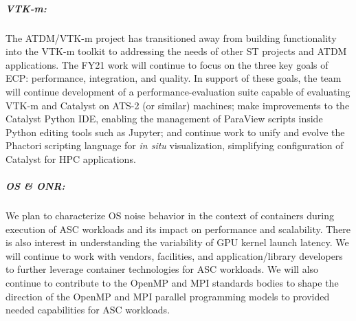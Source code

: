 \subparagraph{VTK-m:} The ATDM/VTK-m project has transitioned away from building functionality into the VTK-m toolkit to addressing the needs of other ST projects and ATDM applications. The FY21 work will continue to focus on the three key goals of ECP: performance, integration, and quality.  In support of these goals, the team will continue development of a performance-evaluation suite capable of evaluating VTK-m and Catalyst on ATS-2 (or similar) machines; make improvements to the Catalyst Python IDE, enabling the management of ParaView scripts inside Python editing tools such as Jupyter; and continue work to unify and evolve the Phactori scripting language for \emph{in situ} visualization, simplifying configuration of Catalyst for HPC applications.  

\subparagraph{OS \& ONR:} We plan to characterize OS noise behavior in the context of containers during execution of ASC workloads and its impact on performance and scalability. There is also interest in understanding the variability of GPU kernel launch latency. We will continue to work with vendors, facilities, and application/library developers to further leverage container technologies for ASC workloads. We will also continue to contribute to the OpenMP and MPI standards bodies to shape the direction of the OpenMP and MPI parallel programming models to provided needed capabilities for ASC workloads.
